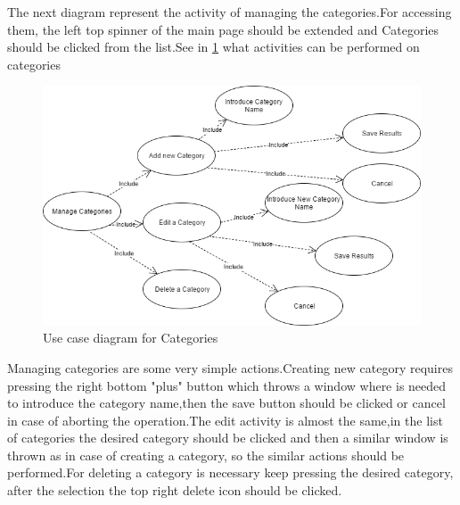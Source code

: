 The next diagram represent the activity of managing the categories.For accessing them, the left top spinner of the main page should be extended and Categories should be clicked from the list.See in \ref{fig:secondusecase} what activities can be performed on categories
\begin{figure}[H]
	\centering
	\includegraphics[width=18cm]{Chapter2/usecasecategoryng.png}
	\caption{Use case diagram for Categories}
	\label{fig:secondusecase}
\end{figure}
Managing categories are some very simple actions.Creating new category requires pressing the right bottom "plus" button which throws a window where is needed to introduce the category name,then the save button should be clicked or cancel in case of aborting the operation.The edit activity is almost the same,in the list of categories the desired category should be clicked and then a similar window is thrown as in case of creating a category, so the similar actions should be performed.For deleting a category is necessary keep pressing the desired category, after the selection the top right delete icon should be clicked.

